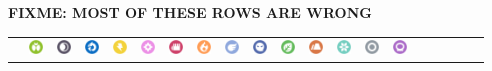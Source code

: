 \textbf{FIXME: MOST OF THESE ROWS ARE WRONG}
\begin{table}[h]
  \begin{center}
  \setlength{\tabcolsep}{1pt}
  \begin{tabular}{c c g c g c g c g c g c g c g c g c g c}
  &
  \includegraphics[width=1em]{images/bug.png} &
    \includegraphics[width=1em]{images/dark.png} &
    \includegraphics[width=1em]{images/dragon.png} &
    \includegraphics[width=1em]{images/electric.png} &
    \includegraphics[width=1em]{images/fairy.png} &
    \includegraphics[width=1em]{images/fighting.png} &
  \includegraphics[width=1em]{images/fire.png} &
    \includegraphics[width=1em]{images/flying.png} &
    \includegraphics[width=1em]{images/ghost.png} &
    \includegraphics[width=1em]{images/grass.png} &
    \includegraphics[width=1em]{images/ground.png} &
    \includegraphics[width=1em]{images/ice.png} &
  \includegraphics[width=1em]{images/normal.png} &
    \includegraphics[width=1em]{images/poison.png} &

\end{tabular}
\end{center}
\end{table}
